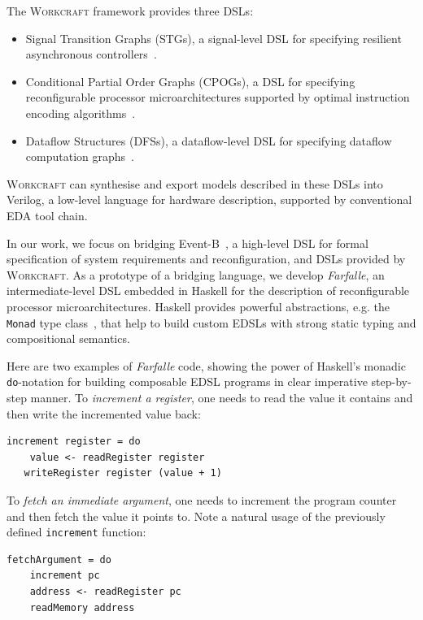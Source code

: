 \documentclass[conference]{IEEEtran}
\begin{document}
The \textsc{Workcraft} framework provides three DSLs:

\begin{itemize}
\item Signal Transition Graphs (STGs), a signal-level DSL for
specifying resilient asynchronous controllers~\cite{STG}.
\item Conditional Partial Order Graphs (CPOGs), a DSL for specifying
reconfigurable processor microarchitectures supported by optimal
instruction encoding algorithms~\cite{ISA-formal}.
\item Dataflow Structures (DFSs), a dataflow-level DSL
for specifying dataflow computation graphs~\cite{DFS}.
\end{itemize}

\textsc{Workcraft} can synthesise and export models described in these DSLs into
Verilog, a low-level language for hardware description, supported
by conventional EDA tool chain.

In our work, we focus on bridging Event-B~\cite{EventB}, a high-level DSL
for formal specification of system requirements and reconfiguration,
and DSLs provided by \textsc{Workcraft}. As a prototype of a bridging language,
we develop \emph{Farfalle}, an intermediate-level DSL embedded in Haskell for
the description of reconfigurable processor microarchitectures.
Haskell provides powerful abstractions, e.g. the \texttt{Monad} type
class~\cite{WadlerMonads},
that help to build custom EDSLs with strong static typing and compositional
semantics.

Here are two examples of \emph{Farfalle} code, showing the power of Haskell's
monadic \texttt{do}-notation for building composable EDSL programs in clear
imperative step-by-step manner. To \emph{increment a register}, one needs to
read the value it contains and then write the incremented value back:

\vspace{-2mm}
\begin{verbatim}
increment register = do
    value <- readRegister register
   writeRegister register (value + 1)
\end{verbatim}
\vspace{-1mm}

To \emph{fetch an immediate argument}, one needs to
increment the program counter and then fetch the value it points to. Note a
natural usage of the previously defined \texttt{increment} function:

\vspace{-2mm}
\begin{verbatim}
fetchArgument = do
    increment pc
    address <- readRegister pc
    readMemory address
\end{verbatim}
\vspace{-1mm}
\end{document}
